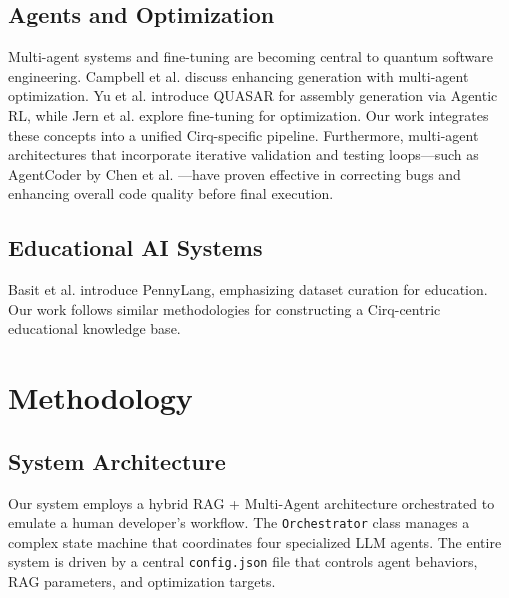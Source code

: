 \documentclass[runningheads]{llncs}
\begin{document}
\subsection{Agents and Optimization}
Multi-agent systems and fine-tuning are becoming central to quantum software engineering. Campbell et al. \cite{campbell2025enhancingllmbasedquantumcode} discuss enhancing generation with multi-agent optimization. Yu et al. \cite{yu2025quasarquantumassemblycode} introduce QUASAR for assembly generation via Agentic RL, while Jern et al. \cite{jern2025agentqfinetuninglargelanguage} explore fine-tuning for optimization. Our work integrates these concepts into a unified Cirq-specific pipeline. Furthermore, multi-agent architectures that incorporate iterative validation and testing loops—such as AgentCoder by Chen et al. \cite{chen2023agentcoder}—have proven effective in correcting bugs and enhancing overall code quality before final execution.

\subsection{Educational AI Systems}
Basit et al. \cite{basit2025pennylangpioneeringllmbasedquantum} introduce PennyLang, emphasizing dataset curation for education. Our work follows similar methodologies for constructing a Cirq-centric educational knowledge base.

\section{Methodology}

\subsection{System Architecture}
Our system employs a hybrid RAG + Multi-Agent architecture orchestrated to emulate a human developer's workflow. The \texttt{Orchestrator} class manages a complex state machine that coordinates four specialized LLM agents. The entire system is driven by a central \texttt{config.json} file that controls agent behaviors, RAG parameters, and optimization targets.
\end{document}
